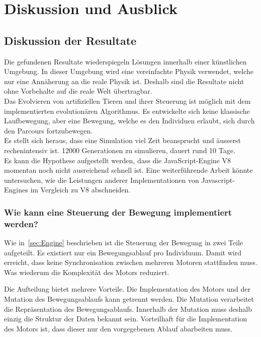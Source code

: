 %
%


\chapter{Diskussion und Ausblick\label{chap:perspective}}

  \section{Diskussion der Resultate\label{sec:diskRes}}

    Die gefundenen Resultate wiederspiegeln Lösungen innerhalb einer künstlichen Umgebung.
    In dieser Umgebung wird eine vereinfachte Physik verwendet, welche nur eine Annäherung an die reale Physik ist.
    Deshalb sind die Resultate nicht ohne Vorbehalte auf die reale Welt übertragbar.
    \\
    Das Evolvieren von artifiziellen Tieren und ihrer Steuerung ist möglich
    mit dem implementierten evolutionären Algorithmus.
    Es entwickelte sich keine klassische Laufbewegung,
    aber eine Bewegung, welche es den Individuen erlaubt, sich durch den Parcours fortzubewegen.
    \\
    Es stellt sich heraus, dass eine Simulation viel Zeit beansprucht und äusserst rechenintensiv ist.
    12000 Generationen zu simulieren, dauert rund 10 Tage.
    \\
    Es kann die Hypothese aufgestellt werden, dass die JavaScript-Engine V8 momentan noch nicht ausreichend schnell ist.
    Eine weiterführende Arbeit könnte untersuchen,
    wie die Leistungen anderer Implementationen von Javascript-Engines im Vergleich zu V8 abschneiden.

    \subsection{Wie kann eine Steuerung der Bewegung implementiert werden?}

      Wie in~\vref{sec:Engine} beschrieben ist die Steuerung der Bewegung in zwei Teile aufgeteilt.
      Es existiert nur ein Bewegungsablauf pro Individuum.
      Damit wird erreicht, dass keine Synchronisation zwischen mehreren Motoren stattfinden muss.
      Was wiederum die Komplexität des Motors reduziert.

      \smallskip

      Die Aufteilung bietet mehrere Vorteile.
      Die Implementation des Motors und der Mutation des Bewegungsablaufs kann getrennt werden.
      Die Mutation verarbeitet die Repräsentation des Bewegungsablaufs.
      Innerhalb der Mutation muss deshalb einzig die Struktur der Daten bekannt sein.
      Vorteilhaft für die Implementation des Motors ist, dass dieser nur den vorgegebenen Ablauf abarbeiten muss.

